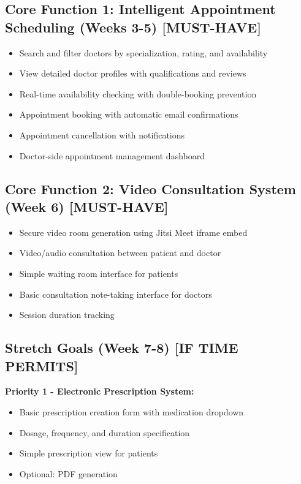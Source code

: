 \documentclass[11pt,a4paper]{article}
\begin{document}
\subsection*{Core Function 1: Intelligent Appointment Scheduling (Weeks 3-5) \textbf{[MUST-HAVE]}}
\begin{itemize}[leftmargin=*, itemsep=0.1em]
    \item Search and filter doctors by specialization, rating, and availability
    \item View detailed doctor profiles with qualifications and reviews
    \item Real-time availability checking with double-booking prevention
    \item Appointment booking with automatic email confirmations
    \item Appointment cancellation with notifications
    \item Doctor-side appointment management dashboard
\end{itemize}

\subsection*{Core Function 2: Video Consultation System (Week 6) \textbf{[MUST-HAVE]}}
\begin{itemize}[leftmargin=*, itemsep=0.1em]
    \item Secure video room generation using Jitsi Meet iframe embed
    \item Video/audio consultation between patient and doctor
    \item Simple waiting room interface for patients
    \item Basic consultation note-taking interface for doctors
    \item Session duration tracking
\end{itemize}

\subsection*{Stretch Goals (Week 7-8) \textbf{[IF TIME PERMITS]}}

\textbf{Priority 1 - Electronic Prescription System:}
\begin{itemize}[leftmargin=*, itemsep=0.1em]
    \item Basic prescription creation form with medication dropdown
    \item Dosage, frequency, and duration specification
    \item Simple prescription view for patients
    \item Optional: PDF generation
\end{itemize}
\end{document}
